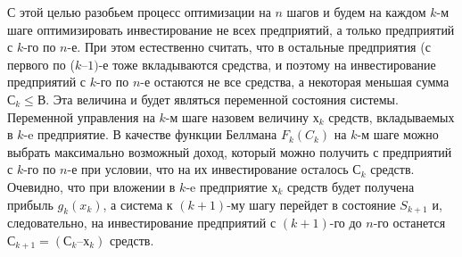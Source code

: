С этой целью разобьем процесс оптимизации на $n$ шагов и будем на каждом $k$-м шаге оптимизировать инвестирование не всех предприятий, а только предприятий с $k$-го по $n$-е. При этом естественно считать, что в остальные предприятия (с первого по ($k–1)$-е тоже вкладываются средства, и поэтому на инвестирование предприятий с $k$-го по $n$-е остаются не все средства, а некоторая меньшая сумма $С_k \leq В$. Эта величина и будет являться переменной состояния системы. Переменной управления на $k$-м шаге назовем величину $х_k$ средств, вкладываемых в $k$-e предприятие. В качестве функции Беллмана $F_k(C_k)$ на $k$-м шаге можно выбрать максимально возможный доход, который можно получить с предприятий с $k$-го по $n$-е при условии, что на их инвестирование осталось $С_k$ средств. Очевидно, что при вложении в $k$-e предприятие $х_k$ средств будет получена прибыль $g_k(x_k)$, а система к $(k+1)$-му шагу перейдет в состояние $S_{k+1}$ и, следовательно, на инвестирование предприятий с $(k+1)$-го до $n$-го останется $С_{k+1} = (С_k – х_k)$ средств.